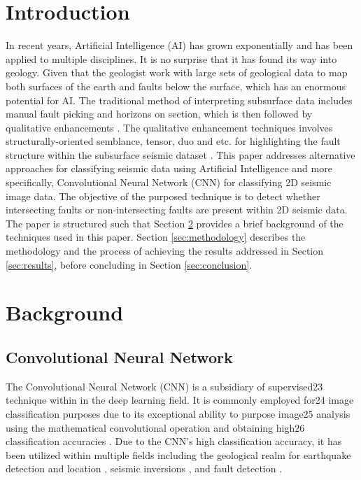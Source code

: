 \documentclass[preprint,12pt]{elsarticle}
\begin{document}
\linenumbers

\section{Introduction}
In recent years, Artificial Intelligence (AI) has grown exponentially
and has been applied to multiple disciplines. It is no surprise that it has
found its way into geology. Given that the geologist work with large sets of
geological data to map both surfaces of the earth and faults below the surface,
which has an enormous potential for AI. The traditional method of interpreting
subsurface data includes manual fault picking and horizons on section, which is
then followed by qualitative enhancements \cite{seismic_interpretation}. The qualitative
enhancement techniques involves structurally-oriented semblance, tensor, duo and etc.
for highlighting the fault structure within the subsurface seismic dataset \cite{seismic_interpretation}.
This paper addresses alternative approaches for classifying seismic data using Artificial
Intelligence and more specifically, Convolutional Neural Network (CNN) for classifying
2D seismic image data. The objective of the purposed technique is to detect whether
intersecting faults or non-intersecting faults are present within 2D seismic data.
The paper is structured such that Section \ref{sec:background} provides a brief background
of the techniques used in this paper. Section \ref{sec:methodology} describes the methodology
and the process of achieving the results addressed in Section \ref{sec:results}, before concluding
in Section \ref{sec:conclusion}.

\section{Background}
\label{sec:background}

\subsection{Convolutional Neural Network}
The Convolutional Neural Network (CNN) is a subsidiary of supervised23
technique within in the deep learning field. It is commonly employed for24
image classification purposes due to its exceptional ability to purpose image25
analysis using the mathematical convolutional operation and obtaining high26
classification accuracies \cite{krizhevsky2012imagenet, zhiqiang2017review}.
Due to the CNN’s high classification accuracy, it has been utilized within
multiple fields including the geological realm for earthquake detection and
location \cite{perol2018convolutional}, seismic inversions \cite{das2019convolutional},
and fault detection \cite{wu2019faultseg3d, xiong2018seismic}.
\end{document}
